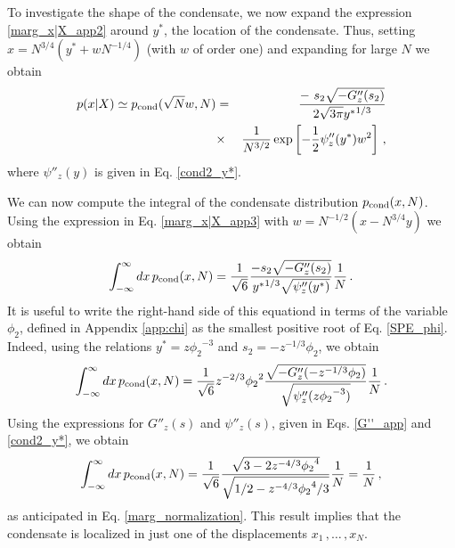\documentclass[aps,pre,twocolumn,superscriptaddress,showpacs]{revtex4-1}
\newcommand{\be}{\begin{equation}}
\newcommand{\ee}{\end{equation}}
\newcommand{\bea}{\begin{eqnarray}}
\newcommand{\eea}{\end{eqnarray}}
\begin{document}
To investigate the shape of the condensate, we now expand the expression \eqref{marg_x|X_app2} around $y^*$, the location of the condensate. Thus, setting $x=N^{3/4}(y^*+w N^{-1/4})$ (with $w$ of order one) and expanding for large $N$ we obtain
\bea
\label{marg_x|X_app3}
p(x|X) \simeq p_{\rm cond}(\sqrt{N}w,N)&=&\frac{ -  ~s_2 \sqrt{-G''_z(s_2)}}{2\sqrt{3\pi} {y^*}^{1/3}}\\ &\times &\frac{1}{N^{3/2}}\exp\left[-\frac{1}{2} \psi''_z(y^*) w^2\right]\,,\nonumber
\eea
where $\psi''_z(y)$ is given in Eq. \eqref{cond2_y*}.


We can now compute the integral of the condensate distribution $p_{\rm cond}(x,N)$. Using the expression in Eq. \eqref{marg_x|X_app3} with $w=N^{-1/2}(x-N^{3/4}y)$ we obtain
\be 
\int_{-\infty}^{\infty}dx\,p_{\rm cond}(x,N)=\frac{1}{\sqrt{6}}\frac{ - s_2 \sqrt{-G''_z(s_2)}}{ {y^*}^{1/3}\sqrt{\psi''_z(y^*)}}\frac{1}{N}\,.
\ee
It is useful to write the right-hand side of this equationd in terms of the variable $\phi_2$, defined in Appendix \ref{app:chi} as the smallest positive root of Eq. \eqref{SPE_phi}. Indeed, using the relations $y^*=z {\phi_2}^{-3}$ and $s_2=-z^{-1/3}\phi_2$, we obtain
\be 
\int_{-\infty}^{\infty}dx\,p_{\rm cond}(x,N)=\frac{1}{\sqrt{6}}z^{-2/3}{\phi_2}^2\frac{   \sqrt{-G''_z(-z^{-1/3}\phi_2)}}{\sqrt{\psi''_z(z {\phi_2}^{-3})}}\frac{1}{N}\,.
\ee
Using the expressions for $G''_z(s)$ and $\psi''_z(s)$, given in Eqs. \eqref{G''_app} and \eqref{cond2_y*}, we obtain
\be 
\int_{-\infty}^{\infty}dx\,p_{\rm cond}(x,N)=\frac{1}{\sqrt{6}}\frac{   \sqrt{3 -2 z^{-4/3}{\phi_2}^{4}}}{\sqrt{1/2-z^{-4/3} {\phi_2}^{4}/3}}\frac{1}{N}=\frac{1}{N}\,,
\ee
as anticipated in Eq. \eqref{marg_normalization}. This result implies that the condensate is localized in just one of the displacements $x_1\,,\ldots\,,x_N$.
\end{document}
